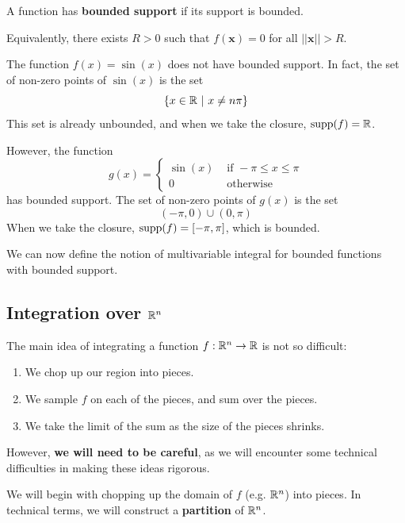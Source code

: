 \begin{definition}
    A function has \textbf{bounded support} if its support is bounded.  

    Equivalently, there exists $R>0$ such that $f(\bm{x}) = 0$ for all $||\bm{x}|| > R$.
    \end{definition}

\begin{example}
    The function $f(x) = \sin(x)$ does not have bounded support.  In fact, the set of non-zero points of $\sin(x)$ is the set
    $$\{x \in \mathbb{R} \ | \ x \neq n\pi \}$$
    This set is already unbounded, and when we take the closure, $\textnormal{supp}(f) = \mathbb{R}$.  
    
    However, the function $$g(x) = \left\{
		\begin{array}{ll}
			\sin(x) & \text{ if } -\pi \leq x \leq \pi \\
			0 & \text{ otherwise}
		\end{array}
		\right.$$
  has bounded support.  The set of non-zero points of $g(x)$ is the set
    $$(-\pi,0) \cup (0,\pi)$$
  When we take the closure, $\textnormal{supp}(f) = [-\pi,\pi]$, which is bounded.  
    

  
\end{example}

We can now define the notion of multivariable integral for bounded functions with bounded support.  


\subsection{Integration over $\mathbb{R}^n$}

The main idea of integrating a function $f: \mathbb{R}^n \to \mathbb{R}$ is not so difficult: 

\begin{enumerate}
    \item We chop up our region into pieces.
    \item We sample $f$ on each of the pieces, and sum over the pieces.
    \item We take the limit of the sum as the size of the pieces shrinks.
\end{enumerate}

However, \textbf{we will need to be careful}, as we will encounter some technical difficulties in making these ideas rigorous.


We will begin with chopping up the domain of $f$ (e.g. $\mathbb{R}^n$) into pieces.  In technical terms, we will construct a \textbf{partition} of $\mathbb{R}^n$.

